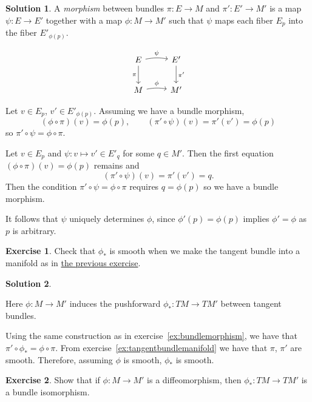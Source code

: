 \documentclass[11pt, a4paper]{report}
\theoremstyle{definition}
\newtheorem{exercise}{Exercise}[part]
\newtheorem{solution}{Solution}[part]
\newenvironment{ex}{\begin{exercise}}{\end{exercise}\pagebreak[1]}
\newenvironment{sol}{\begin{solution}}{\end{solution}\pagebreak[3]}
\begin{document}
\begin{sol}

A \emph{morphism} between bundles $\pi: E \to M$ and $\pi': E' \to M'$ is a map $\psi: E \to E'$ together with a map $\phi: M \to M'$ such that $\psi$ maps each fiber $E_p$ into the fiber $E'_{\phi(p)}$.

\[
    \begin{tikzcd}[row sep=2.1em]
        E \rar[bend left=10]{\psi} \dar[swap]{\pi} & E' \dar{\pi'} \\
        M \rar[bend left=10]{\phi}                 & M'
    \end{tikzcd}
\]

Let $v \in E_p$, $v' \in E'_{\phi(p)}$. Assuming we have a bundle morphism,
\[
    (\phi \circ \pi)(v) = \phi(p), \qquad
    (\pi' \circ \psi)(v) = \pi'(v') = \phi(p)
\]
so $\pi' \circ \psi = \phi \circ \pi$.

Let $v \in E_p$ and $\psi: v \mapsto v' \in E'_q$ for some $q \in M'$. Then the first equation $(\phi \circ \pi)(v) = \phi(p)$ remains and
\[
    (\pi' \circ \psi)(v) = \pi'(v') = q.
\]
Then the condition $\pi' \circ \psi = \phi \circ \pi$ requires $q = \phi(p)$ so we have a bundle morphism.

It follows that $\psi$ uniquely determines $\phi$, since $\phi'(p) = \phi(p)$ implies $\phi' = \phi$ as $p$ is arbitrary.

\end{sol}

\begin{ex}

Check that $\phi_*$ is smooth when we make the tangent bundle into a manifold as in
\hyperref[ex:tangentbundlemanifold]{the previous exercise}.

\end{ex}

\begin{sol}\label{sol:pushforwardtangentbundlesmooth}

Here $\phi: M \to M'$ induces the pushforward $\phi_*: TM \to TM'$ between tangent bundles.

Using the same construction as in exercise~\ref{ex:bundlemorphism}, we have that $\pi' \circ \phi_* = \phi \circ \pi$.
From exercise~\ref{ex:tangentbundlemanifold} we have that $\pi$, $\pi'$ are smooth.
Therefore, assuming $\phi$ is smooth, $\phi_*$ is smooth.

\end{sol}

\begin{ex}

Show that if $\phi: M \to M'$ is a diffeomorphism, then $\phi_*: TM \to TM'$ is a bundle isomorphism.

\end{ex}
\end{document}
